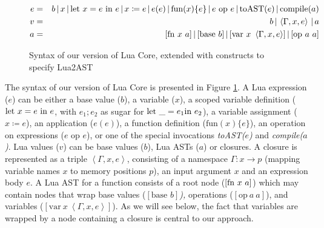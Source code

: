 \documentclass[english]{llncs}
\begin{document}
\begin{figure}[t!]
\begin{eqnarray*}
e & = & b\,|\, x\,|\,\mbox{let \ensuremath{x=e}\ in\ \ensuremath{e}}\,|\, x\coloneqq e\,|\, e(e)\,|\,\mbox{fun}(x)\{e\}\,|\, e\mbox{ op }e\,|\,\mbox{toAST}(e)\,|\,\mbox{compile}(a)\\
v & = & b\,|\,\left\langle \Gamma,x,e\right\rangle \,|\, a\\
a & = & [\mbox{fn\ \ensuremath{x}\ \ensuremath{a}}]\,|\,[\mbox{base\ \ensuremath{b}}]\,|\,[\mbox{var}\ x\ \left\langle \Gamma,x,e\right\rangle ]\,|\,[\mbox{op\ \ensuremath{a}\ \ensuremath{a}}]
\end{eqnarray*}
\protect\caption{\label{fig:LuaCoreSyntax}Syntax of our version of Lua Core, extended
with constructs to specify Lua2AST}
\end{figure}


The syntax of our version of Lua Core is presented in Figure \ref{fig:LuaCoreSyntax}.
A Lua expression ($e$) can be either a base value ($b$), a variable
($x$), a scoped variable definition ($\mbox{let \ensuremath{x=e}\ in\ \ensuremath{e}}$,
with $e_{1};e_{2}$ as sugar for $\mbox{let \ensuremath{\_=e_{1}}in \ensuremath{e_{2}}}$),
a variable assignment ($x\coloneqq e$), an application ($e(e)$),
a function definition ($\mbox{fun}(x)\{e\}$), an operation on expressions
($e\mbox{ op }e$), or one of the special invocations \emph{toAST($e$)}
and \emph{compile($a$)}. Lua values ($v$) can be base values ($b$),
Lua ASTs ($a$) or closures. A closure is represented as a triple
$\left\langle \Gamma,x,e\right\rangle $, consisting of a namespace
$\Gamma:x\rightarrow p$ (mapping variable names $x$ to memory positions
$p$), an input argument $x$ and an expression body $e$. A Lua AST
for a function consists of a root node ($[\mbox{fn\ \ensuremath{x}\ \ensuremath{a}}]$)
which may contain nodes that wrap base values\emph{ }($[\mbox{base }b]$\emph{),
}operations ($[\mbox{op}\ a\ a]$), and variables ($[\mbox{var}\ x\ \left\langle \Gamma,x,e\right\rangle ]$).
As we will see below, the fact that variables are wrapped by a node
containing a closure is central to our approach.
\end{document}
